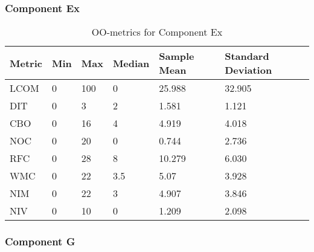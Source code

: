 \subsubsection{Component Ex}
\begin{table}[]
\centering
\caption{OO-metrics for Component Ex}
\label{tab:oometrics-ex}
\begin{tabular}{|l|l|l|l|l|l|}
\hline
\textbf{Metric} & \textbf{Min} & \textbf{Max} & \textbf{Median} & \textbf{Sample Mean} & \textbf{Standard Deviation} \\ \hline
LCOM            & 0           & 100          & 0               & 25.988               & 32.905                      \\ \hline
DIT             & 0            & 3            & 2               & 1.581                & 1.121                       \\ \hline
CBO             & 0            & 16           & 4               & 4.919                & 4.018                       \\ \hline
NOC             & 0            & 20           & 0               & 0.744                & 2.736                       \\ \hline
RFC             & 0            & 28           & 8               & 10.279               & 6.030                       \\ \hline
WMC             & 0            & 22           & 3.5             & 5.07                 & 3.928                       \\ \hline
NIM             & 0            & 22           & 3               & 4.907                & 3.846                       \\ \hline
NIV             & 0            & 10           & 0               & 1.209                & 2.098                       \\ \hline
\end{tabular}
\end{table}







\subsubsection{Component G}

